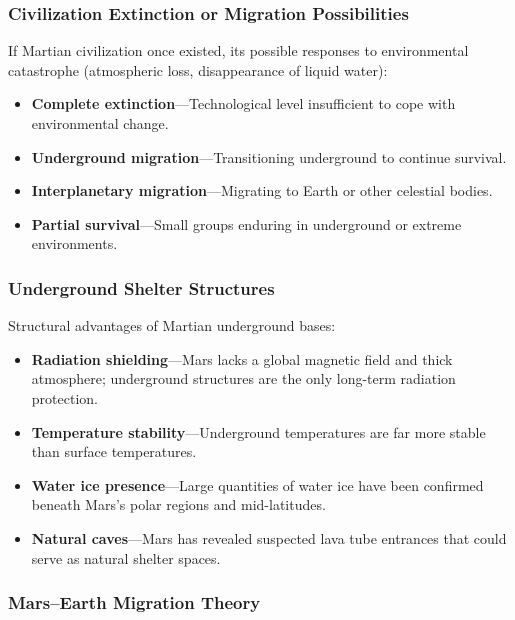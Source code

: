 \documentclass[aps,prd,twocolumn,superscriptaddress,nofootinbib]{revtex4-2}
\begin{document}
\subsubsection{Civilization Extinction or Migration Possibilities}\label{sec:mars-extinction}

If Martian civilization once existed, its possible responses to environmental catastrophe (atmospheric loss, disappearance of liquid water):

\begin{itemize}
  \item \textbf{Complete extinction}---Technological level insufficient to cope with environmental change.
  \item \textbf{Underground migration}---Transitioning underground to continue survival.
  \item \textbf{Interplanetary migration}---Migrating to Earth or other celestial bodies.
  \item \textbf{Partial survival}---Small groups enduring in underground or extreme environments.
\end{itemize}

\subsubsection{Underground Shelter Structures}\label{sec:mars-underground}

Structural advantages of Martian underground bases:

\begin{itemize}
  \item \textbf{Radiation shielding}---Mars lacks a global magnetic field and thick atmosphere; underground structures are the only long-term radiation protection.
  \item \textbf{Temperature stability}---Underground temperatures are far more stable than surface temperatures.
  \item \textbf{Water ice presence}---Large quantities of water ice have been confirmed beneath Mars's polar regions and mid-latitudes.
  \item \textbf{Natural caves}---Mars has revealed suspected lava tube entrances that could serve as natural shelter spaces.
\end{itemize}

\subsubsection{Mars--Earth Migration Theory}\label{sec:mars-earth-migration}
\end{document}
